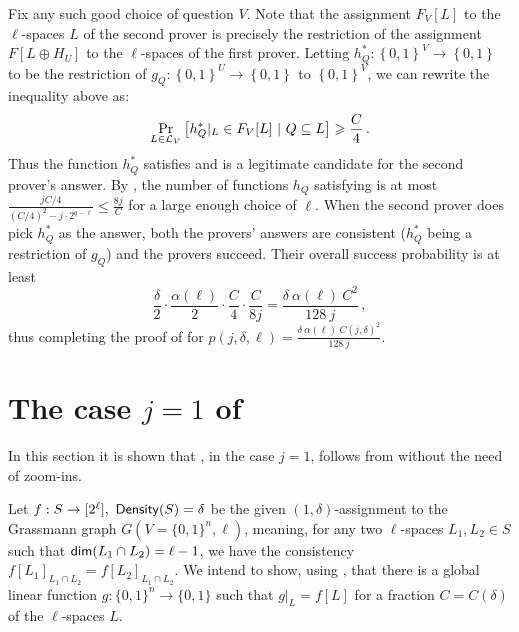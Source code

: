 \documentclass{toc}
\newcommand\set[1]{{\left\{ #1 \right\}}}
\newcommand\Prob[2]{{\Pr_{#1}\left[ {#2} \right]}}
\newcommand\power[1]{\set{0,1}^{#1}}
\newcommand*\xor{\mathbin{\oplus}}
\renewcommand\leq{\leqslant}
\begin{document}
Fix any such good choice of question $V$.
Note that the assignment $F_V[L]$ to the $\ell$-spaces $L$ of the second prover is precisely the restriction of the assignment $F[L\xor H_U]$ to
the $\ell$-spaces of the first prover. Letting $h^*_Q: \power{V}\to\power{}$ to be the restriction of $g_Q:\power{U}\to \power{}$ to $\power{V}$,
we can rewrite the inequality above as:
\[
  \Prob{L \in {\cal L}_V}{h^*_Q|_L  \in F_V[L]  ~|  ~Q \subseteq L}\geqslant \frac{C}{4}\,.%
\]
Thus the function $h^*_Q$ satisfies  and is a legitimate candidate for the second prover's answer. By , the number of functions $h_Q$ satisfying  is at most $\frac{jC/4}{(C/4)^2-j\cdot 2^{q-\ell}} \leq
 \frac{8 j}{C}$ for a large enough choice of $\ell$. When the second prover does pick $h^*_Q$ as the answer, both the provers' answers are
 consistent ($h^*_Q$ being a restriction of $g_Q$) and the provers succeed. Their overall success probability is at least
\[
\frac{\delta}{2} \cdot \frac{\alpha(\ell)}{2} \cdot \frac{C}{4} \cdot \frac{C}{8j} =
\frac{\delta ~\alpha(\ell) ~C^2}{128 ~j}\,,%
\]
thus completing the proof of  for $p(j,\delta,\ell) = \frac{\delta ~\alpha(\ell) ~C(j,\delta)^2}{128 ~j}$.


\section{The case \texorpdfstring{$j=1$}{j=1} of }
\label{section:j_1}
In this section it is shown that ,
in the case $j=1$, follows from  without the need of zoom-ins.

\smallskip
Let $f:S \to [2^\ell], ~{\sf Density}(S)=\delta$ be the given $(1,\delta)$-assignment to
the Grassmann graph $G(V=\{0,1\}^n, \ell)$, meaning, for any two $\ell$-spaces
$L_1, L_2 \in S$ such that ${\sf dim} (L_1 \cap L_2) = \ell-1$, we have the consistency $f[L_1]_{L_1 \cap L_2} = f[L_2]_{L_1 \cap L_2}$.
We intend to show, using , that there is a global
linear function $g: \{0,1\}^n \to \{0,1\}$ such that $g|_L = f[L]$ for a fraction $C = C(\delta)$ of the $\ell$-spaces $L$.
\end{document}

